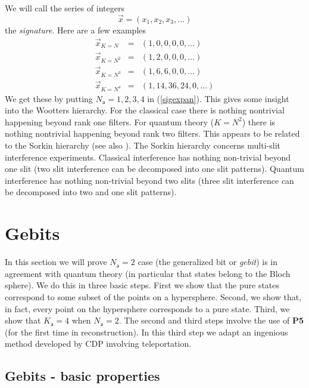 \documentclass[10pt]{article}
\begin{document}
We will call the series of integers
\begin{equation}
\stackrel{\rightarrow}{x} = (x_1, x_2, x_3, \dots )
\end{equation}
the \emph{signature}.  Here are a few examples
\begin{eqnarray}
\stackrel{\rightarrow}{x}_{K=N} & = & (1, 0, 0, 0, 0, \dots) \\
\stackrel{\rightarrow}{x}_{K=N^2} & = & (1, 2, 0, 0, 0,\dots) \\
\stackrel{\rightarrow}{x}_{K=N^3} & = & (1, 6, 6, 0, 0, \dots) \\
\stackrel{\rightarrow}{x}_{K=N^4} & = & (1, 14, 36, 24, 0,  \dots)
\end{eqnarray}
We get these by putting $N_\mathsf{a}=1, 2, 3, 4$ in (\ref{sigexpan}).  This gives some insight into the Wootters hierarchy.  For the classical case there is nothing nontrivial happening beyond rank one filters.  For quantum theory ($K=N^2$) there is nothing nontrivial happening beyond rank two filters.  This appears to be related to the Sorkin hierarchy \cite{sorkin1994quantum} (see also \cite{ududec2010three, sinha2010ruling, niestegge2009sorkin}).   The Sorkin hierarchy concerns multi-slit interference experiments.  Classical interference has nothing non-trivial beyond one slit (two slit interference can be decomposed into one slit patterns).  Quantum interference has nothing non-trivial beyond two slits (three slit interference can be decomposed into two and one slit patterns).


\section{Gebits}\label{gebitssection}

In this section we will prove $N_\mathsf{a}=2$ case (the generalized bit or \emph{gebit}) is in agreement with quantum theory (in particular that states belong to the Bloch sphere).  We do this in three basic steps. First we show that the pure states correspond to some subset of the points on a hypersphere. Second, we show that, in fact, every point on the hypersphere corresponds to a pure state. Third, we show that $K_\mathsf{a}=4$ when $N_\mathsf{a}=2$.  The second and third steps involve the use of {\bf P5} (for the first time in reconstruction).  In this third step we adapt an ingenious method developed by CDP involving teleportation.


\subsection{Gebits - basic properties}\label{gebitbasicproperties}
\end{document}
